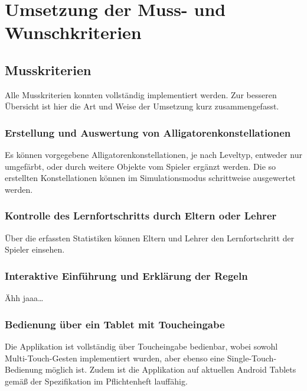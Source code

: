 \chapter{Umsetzung der Muss- und Wunschkriterien}


\section{Musskriterien}

Alle Musskriterien konnten vollständig implementiert werden. Zur besseren Übersicht ist hier die Art und Weise der Umsetzung kurz zusammengefasst.

\subsection{Erstellung und Auswertung von Alligatorenkonstellationen}

Es können vorgegebene Alligatorenkonstellationen, je nach Leveltyp, entweder nur umgefärbt, oder durch weitere Objekte vom Spieler ergänzt werden.
Die so erstellten Konstellationen können im Simulationsmodus schrittweise ausgewertet werden.

\subsection{Kontrolle des Lernfortschritts durch Eltern oder Lehrer}

Über die erfassten Statistiken können Eltern und Lehrer den Lernfortschritt der Spieler einsehen.

\subsection{Interaktive Einführung und Erklärung der Regeln}

Ähh jaaa\dots

\subsection{Bedienung über ein Tablet mit Toucheingabe}

Die Applikation ist vollständig über Toucheingabe bedienbar, wobei sowohl Multi-Touch-Gesten implementiert wurden, aber ebenso eine Single-Touch-Bedienung möglich ist.
Zudem ist die Applikation auf aktuellen Android Tablets gemäß der Spezifikation im Pflichtenheft lauffähig.

